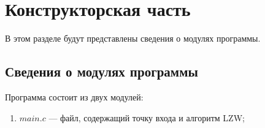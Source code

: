 \chapter{Конструкторская часть}
В этом разделе будут представлены сведения о модулях программы.

\section{Сведения о модулях программы}

Программа состоит из двух модулей:
\begin{enumerate}[label=\arabic*)]
    \item $main.c$ --- файл, содержащий точку входа и алгоритм LZW;
\end{enumerate}
